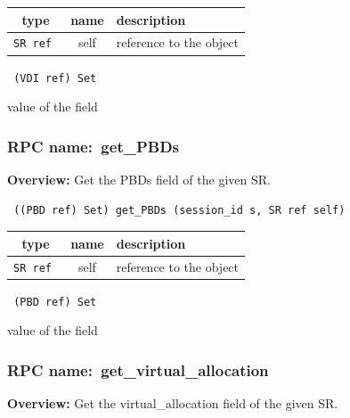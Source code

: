  
\vspace{0.3cm}
\begin{tabular}{|c|c|p{7cm}|}
 \hline
{\bf type} & {\bf name} & {\bf description} \\ \hline
{\tt SR ref } & self & reference to the object \\ \hline 

\end{tabular}

\vspace{0.3cm}

{\tt 
(VDI ref) Set
}


value of the field
\vspace{0.3cm}
\vspace{0.3cm}
\vspace{0.3cm}
\subsubsection{RPC name:~get\_PBDs}

{\bf Overview:} 
Get the PBDs field of the given SR.

\begin{verbatim} ((PBD ref) Set) get_PBDs (session_id s, SR ref self)\end{verbatim}



 
\vspace{0.3cm}
\begin{tabular}{|c|c|p{7cm}|}
 \hline
{\bf type} & {\bf name} & {\bf description} \\ \hline
{\tt SR ref } & self & reference to the object \\ \hline 

\end{tabular}

\vspace{0.3cm}

{\tt 
(PBD ref) Set
}


value of the field
\vspace{0.3cm}
\vspace{0.3cm}
\vspace{0.3cm}
\subsubsection{RPC name:~get\_virtual\_allocation}

{\bf Overview:} 
Get the virtual\_allocation field of the given SR.

